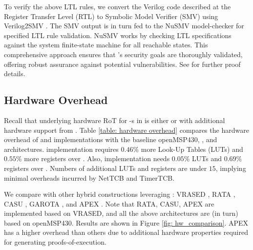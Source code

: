 To verify the above LTL rules, we convert the Verilog code described at the Register Transfer Level 
(RTL) to Symbolic Model Verifier (SMV) \cite{mcmillan1993smv} using Verilog2SMV \cite{irfan2016verilog2smv}.
The SMV output is in turn fed to the NuSMV \cite{cimatti2002nusmv} model-checker for specified LTL 
rule validation. NuSMV works by checking LTL specifications against the system finite-state machine 
for all reachable states. This comprehensive approach ensures that \trapscasu's security goals 
are thoroughly validated, offering robust assurance against potential vulnerabilities.
See \cite{TRAPSAnonOpenSource} for further proof details.



\subsection{Hardware Overhead} \label{subsec:hw_overhead}
%
Recall that underlying hardware RoT for \prv-s in \system is either \casu or \rata with 
additional hardware support from \garota.
Table \ref{table: hardware overhead} compares the hardware overhead of \trapscasu and \trapsrata
implementations with the baseline openMSP430, \casu, and \rata architectures.
\trapscasu implementation requires $0.46$\% more Look-Up Tables (LUTs) and $0.55$\% more registers over 
\casu.  Also, \trapsrata implementation needs $0.05$\% LUTs and $0.69$\% registers over \rata.
Numbers of additional LUTs and registers are under $15$, implying minimal overheads incurred
by NetTCB and TimerTCB.

We compare \system with other hybrid \rot constructions leveraging \ra:
VRASED \cite{vrased}, RATA \cite{rata}, CASU \cite{casu}, GAROTA \cite{garota}, and APEX \cite{nunes2020apex}. 
Note that RATA, CASU, APEX are implemented based on VRASED,
and all the above architectures are (in turn) based on openMSP430.
Results are shown in Figure \ref{fig: hw_comparison}.
APEX has a higher overhead than others due to additional hardware properties required
for generating proofs-of-execution.

